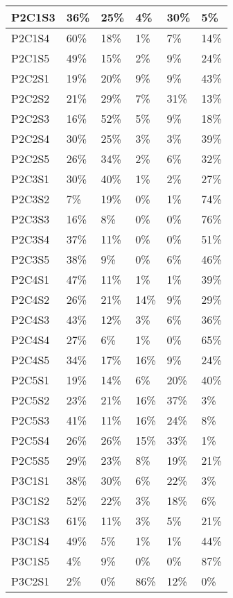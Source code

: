 \begin{longtable}{|l|l|l|l|l|l|}
P2C1S3 & 36\% & 25\% & 4\% & 30\% & 5\% \\ \hline
P2C1S4 & 60\% & 18\% & 1\% & 7\% & 14\% \\ \hline
P2C1S5 & 49\% & 15\% & 2\% & 9\% & 24\% \\ \hline
P2C2S1 & 19\% & 20\% & 9\% & 9\% & 43\% \\ \hline
P2C2S2 & 21\% & 29\% & 7\% & 31\% & 13\% \\ \hline
P2C2S3 & 16\% & 52\% & 5\% & 9\% & 18\% \\ \hline
P2C2S4 & 30\% & 25\% & 3\% & 3\% & 39\% \\ \hline
P2C2S5 & 26\% & 34\% & 2\% & 6\% & 32\% \\ \hline
P2C3S1 & 30\% & 40\% & 1\% & 2\% & 27\% \\ \hline
P2C3S2 & 7\% & 19\% & 0\% & 1\% & 74\% \\ \hline
P2C3S3 & 16\% & 8\% & 0\% & 0\% & 76\% \\ \hline
P2C3S4 & 37\% & 11\% & 0\% & 0\% & 51\% \\ \hline
P2C3S5 & 38\% & 9\% & 0\% & 6\% & 46\% \\ \hline
P2C4S1 & 47\% & 11\% & 1\% & 1\% & 39\% \\ \hline
P2C4S2 & 26\% & 21\% & 14\% & 9\% & 29\% \\ \hline
P2C4S3 & 43\% & 12\% & 3\% & 6\% & 36\% \\ \hline
P2C4S4 & 27\% & 6\% & 1\% & 0\% & 65\% \\ \hline
P2C4S5 & 34\% & 17\% & 16\% & 9\% & 24\% \\ \hline
P2C5S1 & 19\% & 14\% & 6\% & 20\% & 40\% \\ \hline
P2C5S2 & 23\% & 21\% & 16\% & 37\% & 3\% \\ \hline
P2C5S3 & 41\% & 11\% & 16\% & 24\% & 8\% \\ \hline
P2C5S4 & 26\% & 26\% & 15\% & 33\% & 1\% \\ \hline
P2C5S5 & 29\% & 23\% & 8\% & 19\% & 21\% \\ \hline
P3C1S1 & 38\% & 30\% & 6\% & 22\% & 3\% \\ \hline
P3C1S2 & 52\% & 22\% & 3\% & 18\% & 6\% \\ \hline
P3C1S3 & 61\% & 11\% & 3\% & 5\% & 21\% \\ \hline
P3C1S4 & 49\% & 5\% & 1\% & 1\% & 44\% \\ \hline
P3C1S5 & 4\% & 9\% & 0\% & 0\% & 87\% \\ \hline
P3C2S1 & 2\% & 0\% & 86\% & 12\% & 0\% \\ \hline

\end{longtable}
